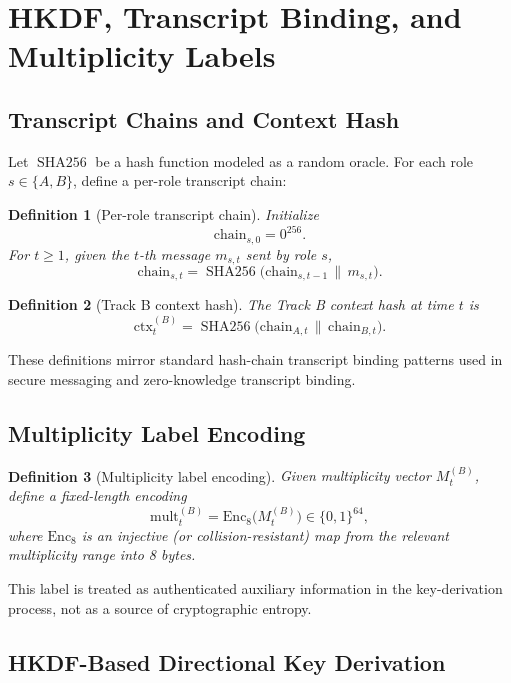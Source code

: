 \documentclass[11pt]{article}
\newtheorem{definition}{Definition}[section]
\DeclareMathOperator{\SHA}{SHA256}
\begin{document}
\section{HKDF, Transcript Binding, and Multiplicity Labels}

\subsection{Transcript Chains and Context Hash}

Let \(\SHA\) be a hash function modeled as a random oracle.
For each role \(s \in \{A,B\}\), define a per-role transcript chain:

\begin{definition}[Per-role transcript chain]
Initialize
\[
  \mathrm{chain}_{s,0} = 0^{256}.
\]
For \(t \ge 1\), given the \(t\)-th message \(m_{s,t}\) sent by role \(s\),
\[
  \mathrm{chain}_{s,t} = \SHA\bigl( \mathrm{chain}_{s,t-1} \,\|\, m_{s,t} \bigr).
\]
\end{definition}

\begin{definition}[Track B context hash]
The Track B context hash at time \(t\) is
\[
  \mathrm{ctx}_t^{(B)} = \SHA\bigl( \mathrm{chain}_{A,t} \,\|\, \mathrm{chain}_{B,t} \bigr).
\]
\end{definition}

These definitions mirror standard hash-chain transcript binding patterns used in secure messaging and zero-knowledge transcript binding.\cite{CommitmentSchemeWiki}

\subsection{Multiplicity Label Encoding}

\begin{definition}[Multiplicity label encoding]
Given multiplicity vector \(M_t^{(B)}\), define a fixed-length encoding
\[
  \mathrm{mult}_t^{(B)} = \mathrm{Enc}_8\bigl(M_t^{(B)}\bigr) \in \{0,1\}^{64},
\]
where \(\mathrm{Enc}_8\) is an injective (or collision-resistant) map from the relevant multiplicity range into 8 bytes.
\end{definition}

This label is treated as authenticated auxiliary information in the key-derivation process, not as a source of cryptographic entropy.

\subsection{HKDF-Based Directional Key Derivation}
\end{document}
